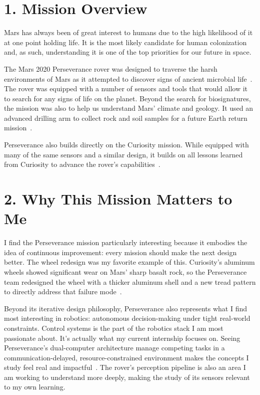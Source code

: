 \documentclass[11pt]{article}
\begin{document}
\section*{1. Mission Overview}
Mars has always been of great interest to humans due to the high likelihood of it at one point
holding life. It is the most likely candidate for human colonization and, as such, understanding
it is one of the top priorities for our future in space.

The Mars 2020 Perseverance rover was designed to traverse the harsh environments of Mars as it
attempted to discover signs of ancient microbial life~\cite{rover_components}. The rover was equipped with a number of sensors
and tools that would allow it to search for any signs of life on the planet. Beyond the search for biosignatures, 
the mission was also to help us understand Mars' climate and geology. It used an advanced drilling arm 
to collect rock and soil samples for a future Earth return mission~\cite{rover_components}.

Perseverance also builds directly on the Curiosity mission. While equipped with many of the same sensors
and a similar design, it builds on all lessons learned from Curiosity to advance the rover's
capabilities~\cite{rover_components}. 

\section*{2. Why This Mission Matters to Me}
I find the Perseverance mission particularly interesting because it embodies the idea of continuous 
improvement: every mission should make the next design better. The wheel redesign was my favorite example of this.
Curiosity's aluminum wheels showed significant wear on Mars' sharp basalt rock,
so the Perseverance team redesigned the wheel with a thicker aluminum shell and a new tread pattern
to directly address that failure mode~\cite{rover_components}.

Beyond its iterative design philosophy, Perseverance also represents what I find most interesting
in robotics: autonomous decision-making under tight real-world constraints. Control systems is the
part of the robotics stack I am most passionate about. It's actually what my current internship focuses on. Seeing
Perseverance's dual-computer architecture manage competing tasks in a communication-delayed,
resource-constrained environment makes the concepts I study feel real and impactful~\cite{science_robotics}. The rover's perception pipeline is also an area I am working to understand
more deeply, making the study of its sensors relevant to my own learning.
\end{document}
